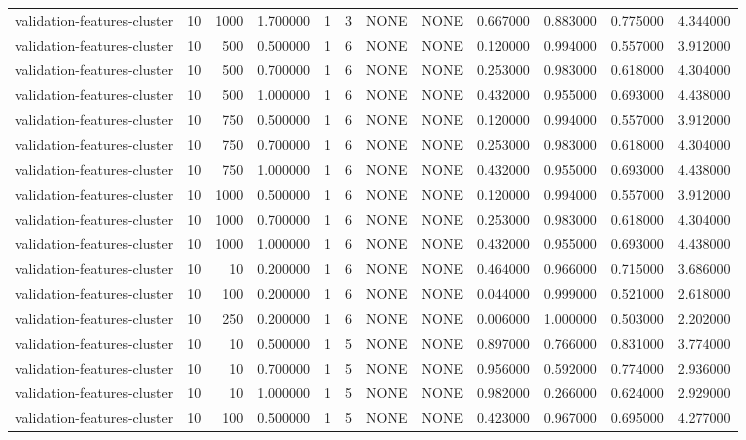 \begin{tabular}{lrrrllllrrrr}
validation-features-cluster & 10 & 1000 & 1.700000 & 1 & 3 & NONE & NONE & 0.667000 & 0.883000 & 0.775000 & 4.344000 \\
validation-features-cluster & 10 & 500 & 0.500000 & 1 & 6 & NONE & NONE & 0.120000 & 0.994000 & 0.557000 & 3.912000 \\
validation-features-cluster & 10 & 500 & 0.700000 & 1 & 6 & NONE & NONE & 0.253000 & 0.983000 & 0.618000 & 4.304000 \\
validation-features-cluster & 10 & 500 & 1.000000 & 1 & 6 & NONE & NONE & 0.432000 & 0.955000 & 0.693000 & 4.438000 \\
validation-features-cluster & 10 & 750 & 0.500000 & 1 & 6 & NONE & NONE & 0.120000 & 0.994000 & 0.557000 & 3.912000 \\
validation-features-cluster & 10 & 750 & 0.700000 & 1 & 6 & NONE & NONE & 0.253000 & 0.983000 & 0.618000 & 4.304000 \\
validation-features-cluster & 10 & 750 & 1.000000 & 1 & 6 & NONE & NONE & 0.432000 & 0.955000 & 0.693000 & 4.438000 \\
validation-features-cluster & 10 & 1000 & 0.500000 & 1 & 6 & NONE & NONE & 0.120000 & 0.994000 & 0.557000 & 3.912000 \\
validation-features-cluster & 10 & 1000 & 0.700000 & 1 & 6 & NONE & NONE & 0.253000 & 0.983000 & 0.618000 & 4.304000 \\
validation-features-cluster & 10 & 1000 & 1.000000 & 1 & 6 & NONE & NONE & 0.432000 & 0.955000 & 0.693000 & 4.438000 \\
validation-features-cluster & 10 & 10 & 0.200000 & 1 & 6 & NONE & NONE & 0.464000 & 0.966000 & 0.715000 & 3.686000 \\
validation-features-cluster & 10 & 100 & 0.200000 & 1 & 6 & NONE & NONE & 0.044000 & 0.999000 & 0.521000 & 2.618000 \\
validation-features-cluster & 10 & 250 & 0.200000 & 1 & 6 & NONE & NONE & 0.006000 & 1.000000 & 0.503000 & 2.202000 \\
validation-features-cluster & 10 & 10 & 0.500000 & 1 & 5 & NONE & NONE & 0.897000 & 0.766000 & 0.831000 & 3.774000 \\
validation-features-cluster & 10 & 10 & 0.700000 & 1 & 5 & NONE & NONE & 0.956000 & 0.592000 & 0.774000 & 2.936000 \\
validation-features-cluster & 10 & 10 & 1.000000 & 1 & 5 & NONE & NONE & 0.982000 & 0.266000 & 0.624000 & 2.929000 \\
validation-features-cluster & 10 & 100 & 0.500000 & 1 & 5 & NONE & NONE & 0.423000 & 0.967000 & 0.695000 & 4.277000 \\

\end{tabular}

